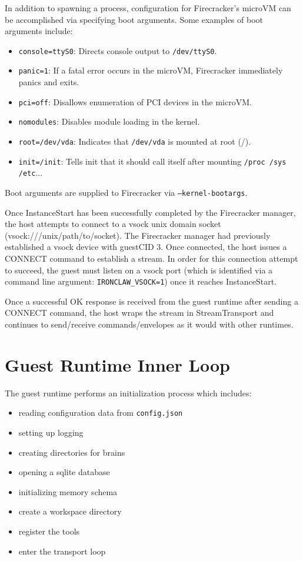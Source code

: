 In addition to spawning a process, configuration for Firecracker's microVM can
be accomplished via specifying boot arguments. Some examples of boot arguments
include:
\begin{itemize}
    \item \texttt{console=ttyS0}: Directs console output to \texttt{/dev/ttyS0}.
    \item \texttt{panic=1}: If a fatal error occurs in the microVM, Firecracker
    immediately panics and exits.
    \item \texttt{pci=off}: Disallows enumeration of PCI devices in the microVM.
    \item \texttt{nomodules}: Disables module loading in the kernel.
    \item \texttt{root=/dev/vda}: Indicates that \texttt{/dev/vda} is mounted at
    root (/).
    \item \texttt{init=/init}: Tells init that it should call itself after
    mounting \texttt{/proc /sys /etc}...
\end{itemize}
Boot arguments are supplied to Firecracker via \texttt{--kernel-bootargs}.

Once InstanceStart has been successfully completed by the Firecracker manager, the host attempts to connect to a vsock unix domain socket (vsock:///unix/path/to/socket). The Firecracker manager had previously established a vsock device with guestCID 3. Once connected, the host issues a CONNECT command to establish a stream. In order for this connection attempt to succeed, the guest must listen on a vsock port (which is identified via a command line argument: \texttt{IRONCLAW\_VSOCK=1}) once it reaches InstanceStart.

Once a successful OK response is received from the guest runtime after sending a CONNECT command, the host wraps the stream in StreamTransport and continues to send/receive commands/envelopes as it would with other runtimes.

\section{Guest Runtime Inner Loop}
The guest runtime performs an initialization process which includes:
\begin{itemize}
    \item reading configuration data from \texttt{config.json}
    \item setting up logging
    \item creating directories for brains
    \item opening a sqlite database
    \item initializing memory schema
    \item create a workspace directory
    \item register the tools
    \item enter the transport loop
\end{itemize}

